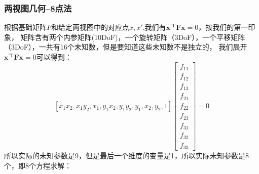 \documentclass[12pt]{article}
\begin{document}
\subsubsection{两视图几何--8点法}
根据基础矩阵$F$和给定两视图中的对应点$x,x'$,我们有$\mathbf{x}^{\prime \mathrm{T}} \mathbf{F} \mathbf{x}=0$，按我们的第一印象，
矩阵含有两个内参矩阵(10DoF)，一个旋转矩阵（3DoF），一个平移矩阵（3DoF），一共有16个未知数，但是要知道这些未知数不是独立的，
我们展开$\mathbf{x}^{\prime \mathrm{T}} \mathbf{F} \mathbf{x}=0$可以得到：
\begin{equation}
    \left[x_{1} x_{2}, x_{1} y_{2}, x_{1}, y_{1} x_{2}, y_{1} y_{2}, y_{1}, x_{2}, y_{2}, 1\right]\left[\begin{array}{c}
        f_{11} \\
        f_{12} \\
        f_{13} \\
        f_{21} \\
        f_{22} \\
        f_{23} \\
        f_{31} \\
        f_{32} \\
        f_{33}
        \end{array}\right]=0
\end{equation}
所以实际的未知参数是9，但是最后一个维度的变量是1，所以实际未知参数是8个，即8个方程求解：
\end{document}
